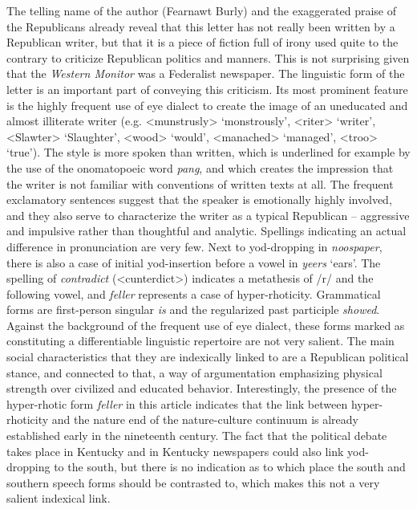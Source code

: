 The telling name of the author (Fearnawt Burly) and the exaggerated praise of the Republicans already reveal that this letter has not really been written by a Republican writer, but that it is a piece of fiction full of irony used quite to the contrary to criticize Republican politics and manners. This is not surprising given that the \textit{Western Monitor} was a Federalist newspaper. The linguistic form of the letter is an important part of conveying this criticism. Its most prominent feature is the highly frequent use of eye dialect to create the image of an uneducated and almost illiterate writer (e.g. <munstrusly> ‘monstrously’, <riter> ‘writer’, <Slawter> ‘Slaughter’, <wood> ‘would’, <manached> ‘managed’, <troo> ‘true’). The style is more spoken than written, which is underlined for example by the use of the onomatopoeic word \emph{pang}, and which creates the impression that the writer is not familiar with conventions of written texts at all. The frequent exclamatory sentences suggest that the speaker is emotionally highly involved, and they also serve to characterize the writer as a typical Republican – aggressive and impulsive rather than thoughtful and analytic. Spellings indicating an actual difference in pronunciation are very few. Next to yod-dropping in \emph{noospaper}, there is also a case of initial yod-insertion before a vowel in \emph{yeers} ‘ears’. The spelling of \emph{contradict} (<cunterdict>) indicates a metathesis of /r/ and the following vowel, and \emph{feller} represents a case of hyper-rhoticity. Grammatical forms are first-person singular \emph{is} and the regularized past participle \emph{showed}. Against the background of the frequent use of eye dialect, these forms marked as constituting a differentiable linguistic repertoire are not very salient. The main social characteristics that they are indexically linked to are a Republican political stance, and connected to that, a way of argumentation emphasizing physical strength over civilized and educated behavior. Interestingly, the presence of the hyper-rhotic form \emph{feller} in this article indicates that the link between hyper-rhoticity and the nature end of the nature-culture continuum is already established early in the nineteenth century. The fact that the political debate takes place in Kentucky and in Kentucky newspapers could also link yod-dropping to the south, but there is no indication as to which place the south and southern speech forms should be contrasted to, which makes this not a very salient indexical link.

